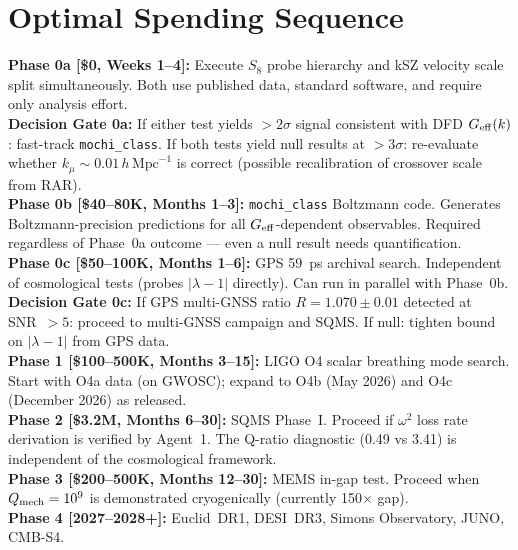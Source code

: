 \documentclass[11pt]{article}
\newcommand{\Geff}{G_{\rm eff}}
\begin{document}
\section{Optimal Spending Sequence}

\begin{tcolorbox}[colback=yellow!5!white, colframe=yellow!60!black,
  title=\textbf{Optimal Decision Cascade (W4i15)}]

\textbf{Phase 0a [\$0, Weeks 1--4]:}
Execute $S_8$ probe hierarchy and kSZ velocity scale split simultaneously.
Both use published data, standard software, and require only
analysis effort.\\[4pt]

\textbf{Decision Gate 0a:} If either test yields $> 2\sigma$ signal
consistent with DFD $\Geff(k)$: fast-track \texttt{mochi\_class}.
If both tests yield null results at $> 3\sigma$: re-evaluate whether
$k_\mu \sim 0.01\,h\,\text{Mpc}^{-1}$ is correct (possible recalibration
of crossover scale from RAR).\\[4pt]

\textbf{Phase 0b [\$40--80K, Months 1--3]:}
\texttt{mochi\_class} Boltzmann code. Generates Boltzmann-precision
predictions for all $\Geff$-dependent observables. Required regardless
of Phase~0a outcome --- even a null result needs quantification.\\[4pt]

\textbf{Phase 0c [\$50--100K, Months 1--6]:}
GPS 59~ps archival search. Independent of cosmological tests (probes
$|\lambda - 1|$ directly). Can run in parallel with Phase~0b.\\[4pt]

\textbf{Decision Gate 0c:} If GPS multi-GNSS ratio $R = 1.070 \pm 0.01$
detected at SNR~$> 5$: proceed to multi-GNSS campaign and SQMS.
If null: tighten bound on $|\lambda - 1|$ from GPS data.\\[4pt]

\textbf{Phase 1 [\$100--500K, Months 3--15]:}
LIGO O4 scalar breathing mode search. Start with O4a data (on GWOSC);
expand to O4b (May 2026) and O4c (December 2026) as released.\\[4pt]

\textbf{Phase 2 [\$3.2M, Months 6--30]:}
SQMS Phase~I. Proceed if $\omega^2$ loss rate derivation is verified by
Agent~1. The Q-ratio diagnostic (0.49 vs 3.41) is independent of the
cosmological framework.\\[4pt]

\textbf{Phase 3 [\$200--500K, Months 12--30]:}
MEMS in-gap test. Proceed when $Q_{\rm mech} = 10^9$ is demonstrated
cryogenically (currently 150$\times$ gap).\\[4pt]

\textbf{Phase 4 [2027--2028+]:}
Euclid~DR1, DESI~DR3, Simons Observatory, JUNO, CMB-S4.

\end{tcolorbox}
\end{document}
